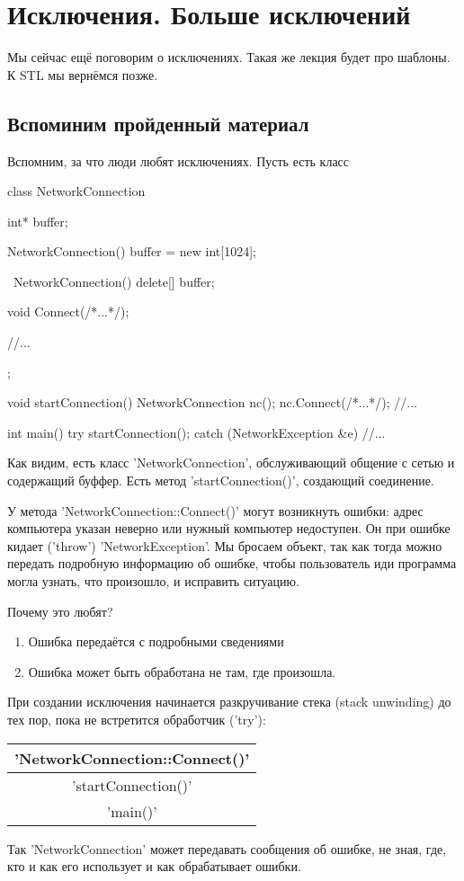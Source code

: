 \chapter{Исключения. Больше исключений}

Мы сейчас ещё поговорим о исключениях.
Такая же лекция будет про шаблоны.
К STL мы вернёмся позже.

\section{Вспоминим пройденный материал}

Вспомним, за что люди любят исключениях. Пусть есть класс
\begin{cppcode}
class NetworkConnection {
	int* buffer;
	
	NetworkConnection() {
		buffer = new int[1024];
	}

	~NetworkConnection() {
		delete[] buffer;
	}

	void Connect(/*...*/);

	//...
};

void startConnection() {
	NetworkConnection nc();
	nc.Connect(/*...*/);
	//...
}

int main() {
	try {
		startConnection();
	}
	catch (NetworkException &e) {
		//...
	}
}
\end{cppcode}
Как видим, есть класс \cpp'NetworkConnection', обслуживающий общение с сетью и содержащий буффер.
Есть метод \cpp'startConnection()', создающий соединение.

У метода \cpp'NetworkConnection::Connect()' могут возникнуть ошибки: адрес компьютера указан неверно или нужный компьютер недоступен.
Он при ошибке кидает (\cpp'throw') \cpp'NetworkException'.
Мы бросаем объект, так как тогда можно передать подробную информацию об ошибке,
чтобы пользователь иди программа могла узнать, что произошло, и исправить ситуацию.

Почему это любят?
\begin{enumerate}
	\item Ошибка передаётся с подробными сведениями
	\item Ошибка может быть обработана не там, где произошла.
\end{enumerate}

При создании исключения начинается разкручивание стека (stack unwinding) до тех пор, пока не встретится обработчик (\cpp'try'):
\begin{center}\begin{tabular}{|c|}
	\hline \cpp'NetworkConnection::Connect()' \\
	\hline \cpp'startConnection()' \\
	\hline \cpp'main()' \\
	\hline
\end{tabular}\end{center}
Так \cpp'NetworkConnection' может передавать сообщения об ошибке, не зная, где, кто и как его использует и как обрабатывает ошибки.

